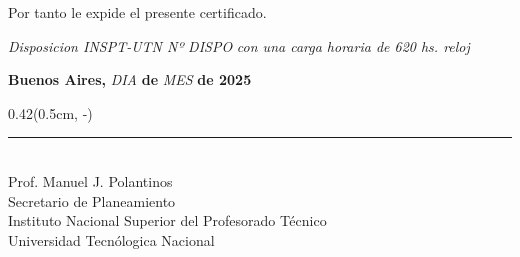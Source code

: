 \documentclass[12pt,a4paper,landscape]{article}
\newlength{\contentwidth}
\newlength{\signaturebottommargin}
\begin{document}
\begin{textblock*}{\contentwidth}
  \begin{center}
      \parbox{\linewidth}{\centering %
      {\garamond\fontsize{20pt}{20pt}\selectfont Por tanto le expide el presente certificado.}
      }
  \end{center}

  \vspace{-0.4cm}

  \begin{center}
    \parbox{\linewidth}{\centering %
    {\garamond\fontsize{18pt}{18pt}\selectfont\textit{Disposicion INSPT-UTN Nº }}
    {\garamond\fontsize{18pt}{18pt}\selectfont\textit{{{DISPO}}}}
    {\garamond\fontsize{18pt}{18pt}\selectfont\textit{con una carga horaria de 620 hs. reloj}}
    }
  \end{center}

  \vspace{0.2cm}

  \begin{center}
      {\parbox{\linewidth}{\centering %
      {\garamond\fontsize{18pt}{18pt}\selectfont\textbf{Buenos Aires, }}
      {\garamond\fontsize{20pt}{20pt}\selectfont\textit{{{DIA}}} }
      {\garamond\fontsize{18pt}{18pt}\selectfont\textbf{de}}
      {\garamond\fontsize{20pt}{20pt}\selectfont\textit{{{MES}}} }
      {\garamond\fontsize{18pt}{18pt}\selectfont\textbf{de 2025}}
      }}
      \vspace*{-5cm}
  \end{center}

\end{textblock*} %




\begin{textblock*}{0.42\linewidth}(0.5cm, \dimexpr\paperheight-\signaturebottommargin-2cm\relax) %
    \centering
    \rule{0.5\linewidth}{0.5pt} \\
    {\arialnarrow\fontsize{12pt}{14pt}\selectfont Prof. Manuel J. Polantinos} \\
    {\arialnarrow\fontsize{10pt}{12pt}\selectfont Secretario de Planeamiento} \\
    {\arialnarrow\fontsize{8pt}{10pt}\selectfont Instituto Nacional Superior del Profesorado Técnico} \\
    {\arialnarrow\fontsize{8pt}{10pt}\selectfont Universidad Tecnólogica Nacional}
\end{textblock*}
\end{document}
